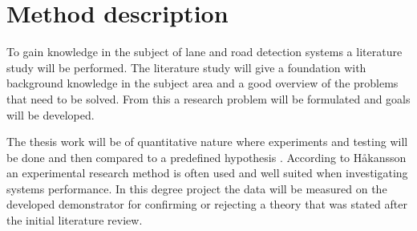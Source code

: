 \section{Method description}
To gain knowledge in the subject of lane and road detection systems a literature study will be performed. The literature study will give a foundation with background knowledge in the subject area and a good overview of the problems that need to be solved. From this a research problem will be formulated and goals will be developed. 

The thesis work will be of quantitative nature where experiments and testing will be done and then compared to a predefined hypothesis \cite{haakansson2013portal}. According to Håkansson \cite{haakansson2013portal} an experimental research method is often used and well suited when investigating systems performance. In this degree project the data will be measured on the developed demonstrator for confirming or rejecting a theory that was stated after the initial literature review.